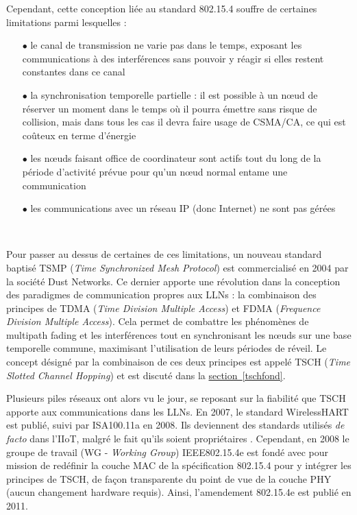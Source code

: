 \documentclass[]{report}
\newcommand{\wordlink}[2]{\hyperref[#2]{#1~\ref{#2}}}
\begin{document}
\par Cependant, cette conception liée au standard 802.15.4 souffre de certaines limitations parmi lesquelles :\\

\begin{itemize}
\item[$\bullet$] le canal de transmission ne varie pas dans le temps, exposant les communications à des interférences sans pouvoir y réagir si elles restent constantes dans ce canal
\vspace{0.2cm}
\item[$\bullet$] la synchronisation temporelle partielle : il est possible à un nœud de réserver un moment dans le temps où il pourra émettre sans risque de collision, mais dans tous les cas il devra faire usage de CSMA/CA, ce qui est coûteux en terme d'énergie
\vspace{0.2cm}
\item[$\bullet$] les nœuds faisant office de coordinateur sont actifs tout du long de la période d'activité prévue pour qu'un nœud normal entame une communication
\vspace{0.2cm}
\item[$\bullet$] les communications avec un réseau IP (donc Internet) ne sont pas gérées
\end{itemize}
~\\
\par Pour passer au dessus de certaines de ces limitations, un nouveau standard baptisé TSMP (\textit{Time Synchronized Mesh Protocol}) est commercialisé en 2004 par la société Dust Networks. Ce dernier apporte une révolution dans la conception des paradigmes de communication propres aux LLNs : la combinaison des principes de TDMA (\textit{Time Division Multiple Access}) et FDMA (\textit{Frequence Division Multiple Access}). Cela permet de combattre les phénomènes de multipath fading et les interférences tout en synchronisant les nœuds sur une base temporelle commune, maximisant l'utilisation de leurs périodes de réveil. Le concept désigné par la combinaison de ces deux principes est appelé TSCH (\textit{Time Slotted Channel Hopping}) et est discuté dans la \wordlink{section}{tschfond}.\\

\par Plusieurs piles réseaux ont alors vu le jour, se reposant sur la fiabilité que TSCH apporte aux communications dans les LLNs. En 2007, le standard WirelessHART est publié, suivi par ISA100.11a en 2008. Ils deviennent des standards utilisés \textit{de facto} dans l'IIoT, malgré le fait qu'ils soient propriétaires \cite{link-layer-sec-impact}. Cependant, en 2008 le groupe de travail (WG - \textit{Working Group}) IEEE802.15.4e est fondé avec pour mission de redéfinir la couche MAC de la spécification 802.15.4 pour y intégrer les principes de TSCH, de façon transparente du point de vue de la couche PHY (aucun changement hardware requis). Ainsi, l'amendement 802.15.4e est publié en 2011.\\
\end{document}
